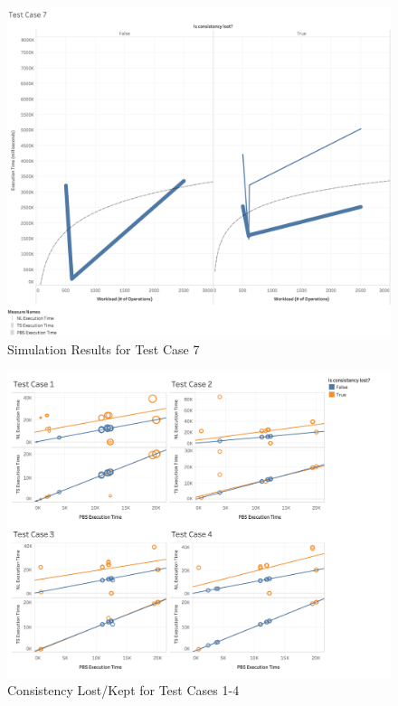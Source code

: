 \begin{figure}
\centering
\includegraphics[scale=0.20]{images/TestCase7(WL).png}
\caption{Simulation Results for Test Case 7}
\label{results:test_case_graphs_7}
\end{figure}

\begin{figure}
\centering
\includegraphics[scale=0.25]{images/Dashboard1_TL.png}
\caption{Consistency Lost/Kept for Test Cases 1-4}
\label{results:consistency_test_case_graphs_1_4}
\end{figure}

